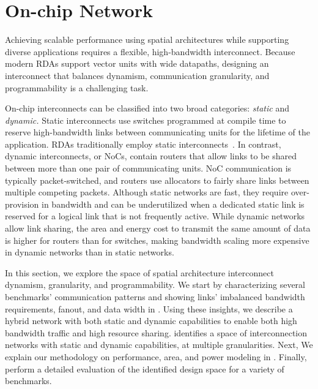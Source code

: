 \section{On-chip Network} \label{sec:network}

Achieving scalable performance using spatial architectures while supporting diverse applications requires a flexible, high-bandwidth interconnect.
 Because modern RDAs support vector units with wide datapaths, designing an interconnect that balances dynamism, communication granularity, and programmability is a challenging task.

On-chip interconnects can be classified into two broad categories: \emph{static} and \emph{dynamic.}
 {Static interconnects} use switches programmed at compile time to reserve high-bandwidth links between communicating units for the lifetime of the application.
RDAs traditionally employ static interconnects~\cite{cgraSurvey1, cgraSurvey2}.
In contrast, {dynamic interconnects}, or NoCs, contain routers that allow links to be shared between more than one pair of communicating units.
NoC communication is typically packet-switched, and routers use allocators to fairly share links between multiple competing packets.
Although static networks are fast, they require over-provision in bandwidth and can be underutilized
when a dedicated static link is reserved for a logical link that is not frequently active. 
While dynamic networks allow link sharing, the area and energy cost to transmit the same amount of data is higher for routers than for switches, making bandwidth scaling more expensive in dynamic networks than in static networks.

In this section, we explore the space of spatial architecture interconnect dynamism, granularity, and programmability.
We start by characterizing several benchmarks' communication patterns and showing links' imbalanced
bandwidth requirements, fanout, and data width in . 
Using these insights, we describe a hybrid network with both static and dynamic capabilities to enable both high bandwidth traffic and high resource sharing.
 identifies a space of interconnection networks with static and dynamic capabilities, at multiple granularities. 
Next, We explain our methodology on performance, area, and power modeling in .
Finally,  perform a detailed evaluation of the identified design space for a variety of benchmarks.

